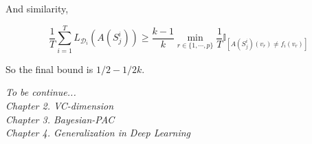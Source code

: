 \documentclass{article}
\begin{document}
\begin{itemize}
\begin{itemize}
And similarity,

	\begin{equation*}
	\frac{1}{T}\sum_{i=1}^T L_{\mathcal{D}_i} (A(S_j^i))\geq\frac{k-1}{k}\min_{r\in\{1,\cdots,p\}}\frac{1}{T}\mathbb{I}_{[A(S^i_j)(v_r)\neq f_i(v_r)]}
	\end{equation*}
	
	So the final bound is $1/2-1/2k$.
\end{itemize} 

\end{itemize}
\textit{
      To be continue...\\
      Chapter 2. VC-dimension\\
      Chapter 3. Bayesian-PAC\\
      Chapter 4. Generalization in Deep Learning}
\end{document}

